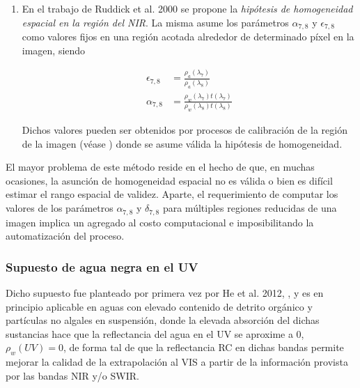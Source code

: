 \begin{enumerate}
                \item En el trabajo de Ruddick et al. 2000 \cite{ruddick2000} se propone la \textit{hipótesis de homogeneidad espacial en la región del NIR}. La misma asume los parámetros $\alpha_{7,8}$ y $\epsilon_{7,8}$ como valores fijos en una región acotada alrededor de determinado píxel en la imagen, siendo
                            
                \begin{equation}
                    \begin{aligned}
                        \epsilon_{7,8}&=\frac{\rho_{a}(\lambda_{7})}{\rho_{a}(\lambda_{8})}\\
                        \alpha_{7,8}&=\frac{\rho_{w}(\lambda_{7})t(\lambda_{7})}{\rho_{w}(\lambda_{8})t(\lambda_{8})}
                        \label{int:eq:RUDD:alphaydelta}
                    \end{aligned}
                \end{equation}
                    
                Dichos valores pueden ser obtenidos por procesos de calibración de la región de la imagen (véase \cite{ruddick2000}) donde se asume válida la hipótesis de homogeneidad.
            \end{enumerate}
            
            El mayor problema de este método reside en el hecho de que, en muchas ocasiones, la asunción de homogeneidad espacial no es válida o bien es difícil estimar el rango espacial de validez. Aparte, el requerimiento de computar los valores de los parámetros $\alpha_{7,8}$ y $\delta_{7,8}$ para múltiples regiones reducidas de una imagen implica un agregado al costo computacional e imposibilitando la automatización del proceso.

        \subsubsection{Supuesto de agua negra en el UV}
        \label{int:s:ACUV}
            Dicho supuesto fue planteado por primera vez por He et al. 2012, \cite{he2012}, y es en principio aplicable en aguas con elevado contenido de detrito orgánico y partículas no algales en suspensión, donde la elevada absorción del dichas sustancias hace que la reflectancia del agua en el UV se aproxime a 0, $\rho_{w}(UV)=0$, de forma tal de que la reflectancia RC en dichas bandas permite mejorar la calidad de la extrapolación al VIS a partir de la información provista por las bandas NIR y/o SWIR.
            

